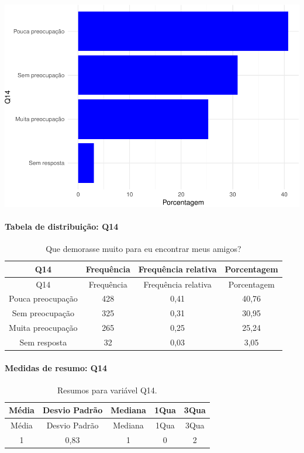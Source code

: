 \documentclass[]{article}
\let\oldparagraph\paragraph
\renewcommand{\paragraph}[1]{\oldparagraph{#1}\mbox{}}
\begin{document}
\begin{center}\includegraphics[width=0.75\linewidth]{relatorio_files/figure-latex/unnamed-chunk-57-1} \end{center}

\hypertarget{tabela-de-distribuiuxe7uxe3o-q14}{%
\paragraph{Tabela de distribuição: Q14}\label{tabela-de-distribuiuxe7uxe3o-q14}}

\begin{longtable}[]{@{}cccc@{}}
\caption{\label{tab:unnamed-chunk-58}Que demorasse muito para eu encontrar meus amigos?}\tabularnewline
\toprule
Q14 & Frequência & Frequência relativa & Porcentagem\tabularnewline
\midrule
\endfirsthead
\toprule
Q14 & Frequência & Frequência relativa & Porcentagem\tabularnewline
\midrule
\endhead
Pouca preocupação & 428 & 0,41 & 40,76\tabularnewline
Sem preocupação & 325 & 0,31 & 30,95\tabularnewline
Muita preocupação & 265 & 0,25 & 25,24\tabularnewline
Sem resposta & 32 & 0,03 & 3,05\tabularnewline
\bottomrule
\end{longtable}

\hypertarget{medidas-de-resumo-q14}{%
\paragraph{Medidas de resumo: Q14}\label{medidas-de-resumo-q14}}

\begin{longtable}[]{@{}ccccc@{}}
\caption{\label{tab:unnamed-chunk-59}Resumos para variável Q14.}\tabularnewline
\toprule
Média & Desvio Padrão & Mediana & 1Qua & 3Qua\tabularnewline
\midrule
\endfirsthead
\toprule
Média & Desvio Padrão & Mediana & 1Qua & 3Qua\tabularnewline
\midrule
\endhead
1 & 0,83 & 1 & 0 & 2\tabularnewline
\bottomrule
\end{longtable}
\end{document}
